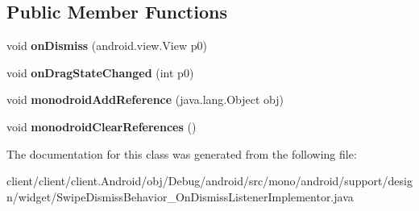 \subsection*{Public Member Functions}
\begin{DoxyCompactItemize}
\item 
\hypertarget{classmono_1_1android_1_1support_1_1design_1_1widget_1_1SwipeDismissBehavior__OnDismissListenerImplementor_a02089f50a204509626734dd1c055ab1a}{}void {\bfseries on\+Dismiss} (android.\+view.\+View p0)\label{classmono_1_1android_1_1support_1_1design_1_1widget_1_1SwipeDismissBehavior__OnDismissListenerImplementor_a02089f50a204509626734dd1c055ab1a}

\item 
\hypertarget{classmono_1_1android_1_1support_1_1design_1_1widget_1_1SwipeDismissBehavior__OnDismissListenerImplementor_a6aa730cbfa98df31e7c6b6ec5ed7fe80}{}void {\bfseries on\+Drag\+State\+Changed} (int p0)\label{classmono_1_1android_1_1support_1_1design_1_1widget_1_1SwipeDismissBehavior__OnDismissListenerImplementor_a6aa730cbfa98df31e7c6b6ec5ed7fe80}

\item 
\hypertarget{classmono_1_1android_1_1support_1_1design_1_1widget_1_1SwipeDismissBehavior__OnDismissListenerImplementor_ae605fb05b54f87719255cdd580d427aa}{}void {\bfseries monodroid\+Add\+Reference} (java.\+lang.\+Object obj)\label{classmono_1_1android_1_1support_1_1design_1_1widget_1_1SwipeDismissBehavior__OnDismissListenerImplementor_ae605fb05b54f87719255cdd580d427aa}

\item 
\hypertarget{classmono_1_1android_1_1support_1_1design_1_1widget_1_1SwipeDismissBehavior__OnDismissListenerImplementor_ac75831ca6f427928cf49cef6c842e8d6}{}void {\bfseries monodroid\+Clear\+References} ()\label{classmono_1_1android_1_1support_1_1design_1_1widget_1_1SwipeDismissBehavior__OnDismissListenerImplementor_ac75831ca6f427928cf49cef6c842e8d6}

\end{DoxyCompactItemize}


The documentation for this class was generated from the following file\+:\begin{DoxyCompactItemize}
\item 
client/client/client.\+Android/obj/\+Debug/android/src/mono/android/support/design/widget/Swipe\+Dismiss\+Behavior\+\_\+\+On\+Dismiss\+Listener\+Implementor.\+java\end{DoxyCompactItemize}
